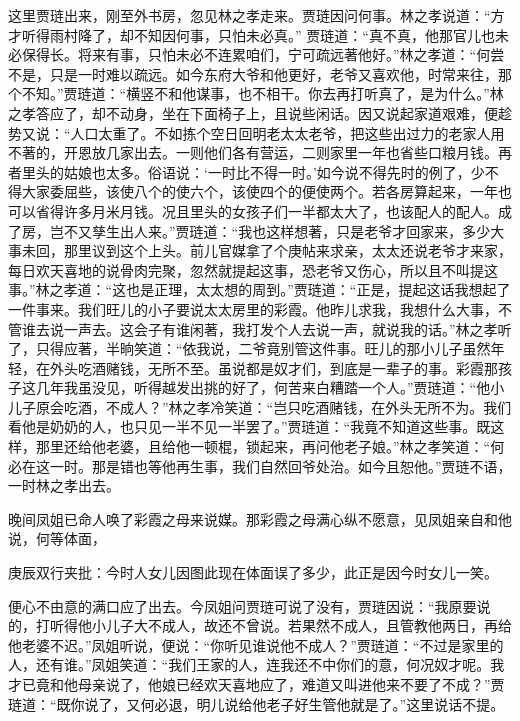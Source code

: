 \begin{parag}


    这里贾琏出来，刚至外书房，忽见林之孝走来。贾琏因问何事。林之孝说道：“方才听得雨村降了，却不知因何事，只怕未必真。” 贾琏道：“真不真，他那官儿也未必保得长。将来有事，只怕未必不连累咱们，宁可疏远著他好。”林之孝道：“何尝不是，只是一时难以疏远。如今东府大爷和他更好，老爷又喜欢他，时常来往，那个不知。”贾琏道：“横竖不和他谋事，也不相干。你去再打听真了，是为什么。”林之孝答应了，却不动身，坐在下面椅子上，且说些闲话。因又说起家道艰难，便趁势又说：“人口太重了。不如拣个空日回明老太太老爷，把这些出过力的老家人用不著的，开恩放几家出去。一则他们各有营运，二则家里一年也省些口粮月钱。再者里头的姑娘也太多。俗语说：‘一时比不得一时。’如今说不得先时的例了，少不得大家委屈些，该使八个的使六个，该使四个的便使两个。若各房算起来，一年也可以省得许多月米月钱。况且里头的女孩子们一半都太大了，也该配人的配人。成了房，岂不又孳生出人来。”贾琏道：“我也这样想著，只是老爷才回家来，多少大事未回，那里议到这个上头。前儿官媒拿了个庚帖来求亲，太太还说老爷才来家，每日欢天喜地的说骨肉完聚，忽然就提起这事，恐老爷又伤心，所以且不叫提这事。”林之孝道：“这也是正理，太太想的周到。”贾琏道：“正是，提起这话我想起了一件事来。我们旺儿的小子要说太太房里的彩霞。他昨儿求我，我想什么大事，不管谁去说一声去。这会子有谁闲著，我打发个人去说一声，就说我的话。”林之孝听了，只得应著，半晌笑道：“依我说，二爷竟别管这件事。旺儿的那小儿子虽然年轻，在外头吃酒赌钱，无所不至。虽说都是奴才们，到底是一辈子的事。彩霞那孩子这几年我虽没见，听得越发出挑的好了，何苦来白糟踏一个人。”贾琏道：“他小儿子原会吃酒，不成人？”林之孝冷笑道：“岂只吃酒赌钱，在外头无所不为。我们看他是奶奶的人，也只见一半不见一半罢了。”贾琏道：“我竟不知道这些事。既这样，那里还给他老婆，且给他一顿棍，锁起来，再问他老子娘。”林之孝笑道：“何必在这一时。那是错也等他再生事，我们自然回爷处治。如今且恕他。”贾琏不语，一时林之孝出去。
\end{parag}


\begin{parag}


    晚间凤姐已命人唤了彩霞之母来说媒。那彩霞之母满心纵不愿意，见凤姐亲自和他说，何等体面，\begin{note}庚辰双行夹批：今时人女儿因图此现在体面误了多少，此正是因今时女儿一笑。\end{note}便心不由意的满口应了出去。今凤姐问贾琏可说了没有，贾琏因说：“我原要说的，打听得他小儿子大不成人，故还不曾说。若果然不成人，且管教他两日，再给他老婆不迟。”凤姐听说，便说：“你听见谁说他不成人？”贾琏道：“不过是家里的人，还有谁。”凤姐笑道：“我们王家的人，连我还不中你们的意，何况奴才呢。我才已竟和他母亲说了，他娘已经欢天喜地应了，难道又叫进他来不要了不成？”贾琏道：“既你说了，又何必退，明儿说给他老子好生管他就是了。”这里说话不提。
\end{parag}



